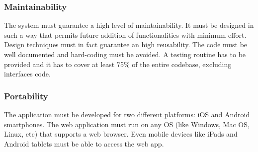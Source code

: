\subsubsection{Maintainability}
The system must guarantee a high level of maintainability. It must be designed in such a way that permits future addition of functionalities with minimum effort.
Design techniques must in fact guarantee an high reusability. The code must be well documented and hard-coding must be avoided. A testing routine has to be provided and it has to cover at least 75\% of the entire codebase, excluding interfaces code.


\subsubsection{Portability}
The application must be developed for two different platforms: iOS and Android smartphones. The web application must run on any OS (like Windows, Mac OS, Linux, etc) that supports a web browser. Even mobile devices like iPads and Android tablets must be able to access the web app.

